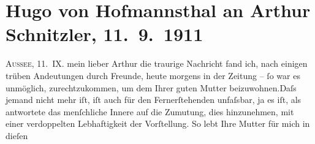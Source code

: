 

         
         \newcommand{\erwaehntePersonen}{Personen: Christiane von Hofmannsthal, Raimund von Hofmannsthal, Franz von Hofmannsthal, Hugo August von Hofmannsthal, Louise Schnitzler}
         \newcommand{\erwaehnteOrte}{Orte: Bad Aussee, Hamburg, Kopenhagen, München, Wien}
         \newcommand{\erwaehnteWerke}{Werke: Das weite Land. Tragikomödie in fünf Akten}
               \section[Hugo von Hofmannsthal an Arthur Schnitzler, 11. 9. 1911]{ Hugo von Hofmannsthal an Arthur Schnitzler, 11. 9. 1911}\nopagebreak{}\rehead{ }\begin{ledgroupsized}[t]{13cm}\normalsize\beginnumbering \toendnotes[C]{\smallbreak\pagebreak[2]} 
\toendnotes[C]{\smallbreak}\pstart
           \raggedleft{}{\pb}\textsc{Aussee}, 11. IX.\pend
           \pstart{}mein lieber Arthur \pend\pstart
           die traurige Nachricht fand ich, nach einigen trüben Andeutungen durch Freunde, heute
               morgens in der Zeitung – ſo war es unmöglich, zurechtzukommen, um dem \label{K_L02027_1v}\label{K_L02027_1h} Ihrer guten Mutter beizuwohnen.\hspace*{1.5em}Daſs jemand nicht mehr iſt, iſt auch für den Fernerſtehenden
               unfaſsbar, ja es iſt, als antwortete das menſchliche Innere {\pb}auf die Zumutung, dies
               hinzunehmen, mit einer verdoppelten Lebhaftigkeit der Vorſtellung. So lebt Ihre Mutter für mich in dieſen

\end{ledgroupsized}
